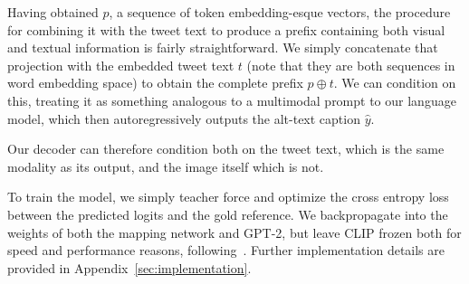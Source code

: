 \documentclass{article} %
\begin{document}

Having obtained $p$, a sequence of token embedding-esque vectors, the procedure for combining it with the tweet text to produce a prefix containing both visual and textual information is fairly straightforward.
We simply concatenate that projection with the embedded tweet text $t$ (note that they are both sequences in word embedding space) to obtain the complete prefix $p \oplus t$.
We can condition on this, treating it as something analogous to a multimodal prompt to our language model, which then autoregressively outputs the alt-text caption $\hat{y}$.

Our decoder can therefore condition both on the tweet text, which is the same modality as its output, and the image itself which is not.

To train the model, we simply teacher force and optimize the cross entropy loss between the predicted logits and the gold reference.
We backpropagate into the weights of both the mapping network and GPT-2, but leave CLIP frozen both for speed and performance reasons, following~\citet{clipcap}.
Further implementation details are provided in Appendix~\ref{sec:implementation}.
\end{document}
